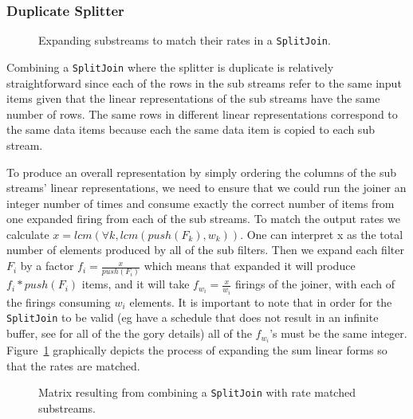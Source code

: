 \subsubsection{Duplicate Splitter}

\begin{figure}
\center
\epsfxsize=3.0in
\caption{Expanding substreams to match their rates in a {\tt SplitJoin}.}
\label{fig:splitjoin-duplicate-ratematch}
\end{figure}

Combining a {\tt SplitJoin} where the splitter is duplicate is relatively straightforward
since each of the rows in the sub streams refer to the same input items given that the
linear representations of the sub streams have the same number of rows. The same rows in
different linear representations correspond to the same data items because each the 
same data item is copied to each sub stream.

To produce an overall representation by simply ordering the columns of the sub streams'
linear representations, we need to ensure that we could run the joiner
an integer number of times and consume exactly the correct number of items from one
expanded firing from each of the sub streams. To match the output rates we calculate
$x=lcm(\forall k, lcm(push(F_k),w_k))$. One can interpret x as the total number of elements
produced by all of the sub filters. Then we expand each filter $F_i$ by a factor
$f_i=\frac{x}{push(F_i)}$ which means that expanded it will produce $f_i*push(F_i)$ items, and
it will take $f_{w_i}=\frac{x}{w_i}$ firings of the joiner, with each of the firings consuming
$w_i$ elements. It is important to note that in order for the {\tt SplitJoin} to be valid
(eg have a schedule that does not result in an infinite buffer, see \cite{karczma-thesis} for
all of the the gory details) all of the $f_{w_i}$'s must be the same integer.
Figure~\ref{fig:splitjoin-duplicate-ratematch} graphically depicts the process of expanding
the sum linear forms so that the rates are matched. 

\begin{figure}
\center
\epsfxsize=3.0in
\caption{Matrix resulting from combining a {\tt SplitJoin} with rate matched substreams.}
\label{fig:splitjoin-duplicate-matrix}
\end{figure}

